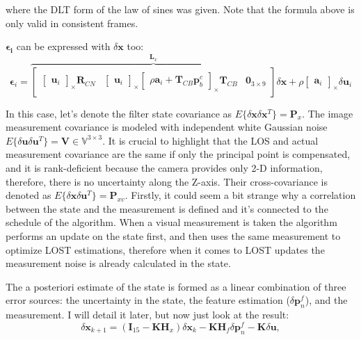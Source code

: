 where the DLT form of the law of sines was given. Note that the formula above is only valid in consistent frames.

$\boldsymbol{\epsilon_i}$ can be expressed with $\delta\mathbf{x}$ too:
\begin{equation}
    \boldsymbol{\epsilon}_i = 
    \overbrace{
    \begin{bmatrix}
        \begin{bmatrix}
            \mathbf{u}_i
        \end{bmatrix}_\times\mathbf{R}_{CN} &
        \begin{bmatrix}
            \mathbf{u}_i
        \end{bmatrix}_\times
        \begin{bmatrix}
            \rho\mathbf{a}_i+\mathbf{T}_{CB}\mathbf{p}_b^c
        \end{bmatrix}_\times
        \mathbf{T}_{CB} &
        \mathbf{0}_{3\times 9}
    \end{bmatrix}}^{\mathbf{L}_x}
    \delta\mathbf{x} +
    \rho\begin{bmatrix}
        \mathbf{a}_i
    \end{bmatrix}_\times
    \delta\mathbf{u}_i
    \label{eq:epsilon}
\end{equation}

In this case, let's denote the filter state covariance as $E\{\delta\mathbf{x}\delta\mathbf{x}^T\}=\mathbf{P}_x$. The image measurement covariance is modeled with independent white Gaussian noise $E\{\delta\mathbf{u}\delta\mathbf{u}^T\}=\mathbf{V}\in\mathbb{V}^{3\times 3}$. It is crucial to highlight that the LOS and actual measurement covariance are the same if only the principal point is compensated, and it is rank-deficient because the camera provides only 2-D information, therefore, there is no uncertainty along the Z-axis. Their cross-covariance is denoted as $E\{\delta\mathbf{x}\delta\mathbf{u}^T\}=\mathbf{P}_{xv}$. Firstly, it could seem a bit strange why a correlation between the state and the measurement is defined and it's connected to the schedule of the algorithm. When a visual measurement is taken the algorithm performs an update on the state first, and then uses the same measurement to optimize LOST estimations, therefore when it comes to LOST updates the measurement noise is already calculated in the state. 

The a posteriori estimate of the state is formed as a linear combination of three error sources: the uncertainty in the state, the feature estimation ($\delta\mathbf{p}_n^f$), and the measurement. I will detail it later, but now just look at the result:
\begin{equation}
    \delta\mathbf{x}_{k+1}=\left(\mathbf{I}_{15}-\mathbf{K}\mathbf{H}_x\right)\delta\mathbf{x}_k-\mathbf{K}\mathbf{H}_f\delta\mathbf{p}_n^f - \mathbf{K}\delta\mathbf{u},
    \label{eq:aposteriori-state}
\end{equation}

